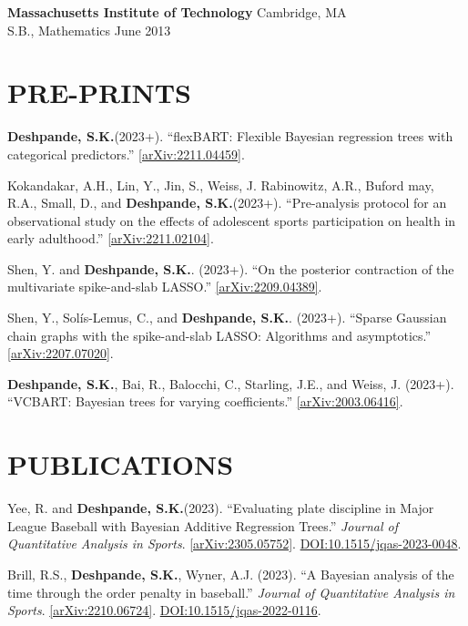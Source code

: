 \documentclass[margin]{res}
\def\skd{\textbf{Deshpande, S.K.}}
\begin{document}
\begin{resume}
                {\bf Massachusetts Institute of Technology} \hfill Cambridge, MA \\
                S.B., Mathematics \hfill June 2013 
  
  
\section{PRE-PRINTS}

\skd (2023+). ``flexBART: Flexible Bayesian regression trees with categorical predictors.'' \href{https://arxiv.org/abs/2211.04459}{[arXiv:2211.04459]}.

Kokandakar, A.H., Lin, Y., Jin, S., Weiss, J. Rabinowitz, A.R., Buford may, R.A., Small, D., and \skd (2023+). ``Pre-analysis protocol for an observational study on the effects of adolescent sports participation on health in early adulthood.'' \href{https://arxiv.org/abs/2211.02104}{[arXiv:2211.02104]}.

Shen, Y. and \skd. (2023+). ``On the posterior contraction of the multivariate spike-and-slab LASSO.'' \href{https://arxiv.org/abs/2209.04389}{[arXiv:2209.04389]}.

Shen, Y., Sol\'{i}s-Lemus, C., and \skd. (2023+). ``Sparse Gaussian chain graphs with the spike-and-slab LASSO: Algorithms and asymptotics.'' \href{https://arxiv.org/abs/2207.07020}{[arXiv:2207.07020]}.

\skd, Bai, R., Balocchi, C., Starling, J.E., and Weiss, J. (2023+). ``VCBART: Bayesian trees for varying coefficients.'' \href{https://arxiv.org/abs/2003.06416}{[arXiv:2003.06416]}. %

\section{PUBLICATIONS}

Yee, R. and \skd (2023). ``Evaluating plate discipline in Major League Baseball with Bayesian Additive Regression Trees.'' \textit{Journal of Quantitative Analysis in Sports}. \href{https://arxiv.org/abs/2305.05752}{[arXiv:2305.05752]}. \href{https://doi.org/10.1515/jqas-2023-0048}{DOI:10.1515/jqas-2023-0048}.

Brill, R.S., \skd, Wyner, A.J. (2023). ``A Bayesian analysis of the time through the order penalty in baseball.'' \textit{Journal of Quantitative Analysis in Sports}. \href{https://arxiv.org/abs/2210.06724}{[arXiv:2210.06724]}. \href{https://doi.org/10.1515/jqas-2022-0116}{DOI:10.1515/jqas-2022-0116}.


\end{resume}
\end{document}
